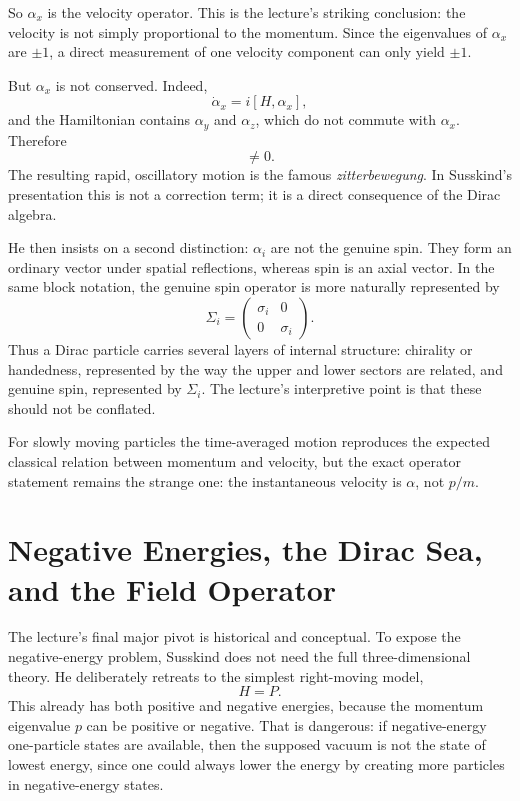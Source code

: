 So \(\alpha_x\) is the velocity operator. This is the lecture's striking conclusion: the velocity is not simply proportional to the momentum. Since the eigenvalues of \(\alpha_x\) are \(\pm1\), a direct measurement of one velocity component can only yield \(\pm1\).

But \(\alpha_x\) is not conserved. Indeed,
\begin{equation}
\dot\alpha_x=i[H,\alpha_x],
\end{equation}
and the Hamiltonian contains \(\alpha_y\) and \(\alpha_z\), which do not commute with \(\alpha_x\). Therefore
\begin{equation}
[H,\alpha_x]\neq0.
\end{equation}
The resulting rapid, oscillatory motion is the famous \emph{zitterbewegung}. In Susskind's presentation this is not a correction term; it is a direct consequence of the Dirac algebra.

He then insists on a second distinction: \(\alpha_i\) are not the genuine spin. They form an ordinary vector under spatial reflections, whereas spin is an axial vector. In the same block notation, the genuine spin operator is more naturally represented by
\begin{equation}
\Sigma_i=
\begin{pmatrix}
\sigma_i&0\\
0&\sigma_i
\end{pmatrix}.
\end{equation}
Thus a Dirac particle carries several layers of internal structure: chirality or handedness, represented by the way the upper and lower sectors are related, and genuine spin, represented by \(\Sigma_i\). The lecture's interpretive point is that these should not be conflated.

For slowly moving particles the time-averaged motion reproduces the expected classical relation between momentum and velocity, but the exact operator statement remains the strange one: the instantaneous velocity is \(\alpha\), not \(p/m\).

\section{Negative Energies, the Dirac Sea, and the Field Operator}

The lecture's final major pivot is historical and conceptual. To expose the negative-energy problem, Susskind does not need the full three-dimensional theory. He deliberately retreats to the simplest right-moving model,
\begin{equation}
H=P.
\end{equation}
This already has both positive and negative energies, because the momentum eigenvalue \(p\) can be positive or negative. That is dangerous: if negative-energy one-particle states are available, then the supposed vacuum is not the state of lowest energy, since one could always lower the energy by creating more particles in negative-energy states.

